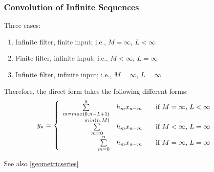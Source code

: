 \subsubsection{Convolution of Infinite Sequences}
Three cases:
\begin{enumerate}
  \item Infinite filter, finite input; i.e., $M = \infty$, $L < \infty$
  \item Finite filter, infinite input; i.e., $M < \infty$, $L = \infty$
  \item Infinite filter, infinite input; i.e., $M = \infty$, $L = \infty$
\end{enumerate}
\resetArrayStretch

Therefore, the direct form takes the following different forms:
\[
	y_n =
		\left\{
			\begin{array}{r l l}
				\sum\limits_{m=max(0,n-L+1)}^{n} & h_m x_{n-m}		& \quad \text{if $M = \infty$, $L < \infty$} \\	
				\sum\limits_{m=0}^{min(n,M)} & h_m x_{n-m}		& \quad \text{if $M < \infty$, $L = \infty$ } \\
				\sum\limits_{m=0}^{n} & h_m x_{n-m}	& \quad \text{if $M = \infty$, $L = \infty$ }
			\end{array}
		\right.
\]

See also \ref{geometricseries} 
